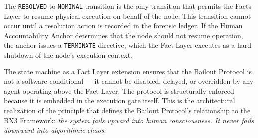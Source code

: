 The \texttt{RESOLVED} to \texttt{NOMINAL} transition is the only transition that permits the Facts Layer to resume physical execution on behalf of the node. This transition cannot occur until a resolution action is recorded in the forensic ledger. If the Human Accountability Anchor determines that the node should not resume operation, the anchor issues a \texttt{TERMINATE} directive, which the Fact Layer executes as a hard shutdown of the node's execution context.

The state machine as a Fact Layer extension ensures that the Bailout Protocol is not a software conditional --- it cannot be disabled, delayed, or overridden by any agent operating above the Fact Layer. The protocol is structurally enforced because it is embedded in the execution gate itself. This is the architectural realization of the principle that defines the Bailout Protocol's relationship to the BX3 Framework: \emph{the system fails upward into human consciousness. It never fails downward into algorithmic chaos}.
